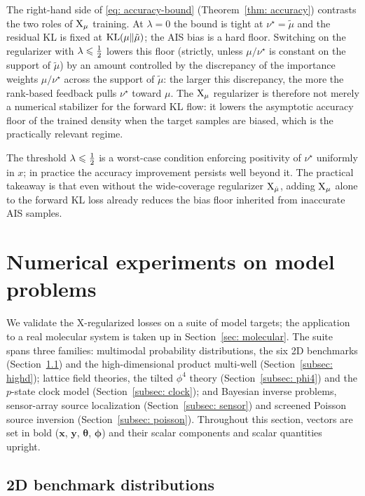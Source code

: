 \documentclass{article}
\begin{document}
The right-hand side of \eqref{eq: accuracy-bound} (Theorem~\ref{thm: accuracy}) contrasts the two roles of $\mathrm{X}_\mu$ training. At $\lambda = 0$ the bound is tight at $\nu^\star = \tilde\mu$ and the residual KL is fixed at $\mathrm{KL}(\mu\|\tilde\mu)$; the AIS bias is a hard floor. Switching on the regularizer with $\lambda \leqslant \frac12$ lowers this floor (strictly, unless $\mu/\nu^\star$ is constant on the support of $\tilde\mu$) by an amount controlled by the discrepancy of the importance weights $\mu/\nu^\star$ across the support of $\tilde\mu$: the larger this discrepancy, the more the rank-based feedback pulls $\nu^\star$ toward $\mu$. The $\mathrm{X}_\mu$ regularizer is therefore not merely a numerical stabilizer for the forward KL flow: it lowers the asymptotic accuracy floor of the trained density when the target samples are biased, which is the practically relevant regime.

The threshold $\lambda \leqslant \frac12$ is a worst-case condition enforcing positivity of $\nu^\star$ uniformly in $x$; in practice the accuracy improvement persists well beyond it. The practical takeaway is that even without the wide-coverage regularizer $\mathrm{X}_{\hat\mu}$, adding $\mathrm{X}_\mu$ alone to the forward KL loss already reduces the bias floor inherited from inaccurate AIS samples.


\section{Numerical experiments on model problems}
\label{sec: experiments}

We validate the X-regularized losses on a suite of model targets; the application to a real molecular system is taken up in Section~\ref{sec: molecular}. The suite spans three families: multimodal probability distributions, the six 2D benchmarks (Section~\ref{subsec: 2d-benchmark}) and the high-dimensional product multi-well (Section~\ref{subsec: highd}); lattice field theories, the tilted $\phi^4$ theory (Section~\ref{subsec: phi4}) and the $p$-state clock model (Section~\ref{subsec: clock}); and Bayesian inverse problems, sensor-array source localization (Section~\ref{subsec: sensor}) and screened Poisson source inversion (Section~\ref{subsec: poisson}). Throughout this section, vectors are set in bold ($\mathbf{x}$, $\mathbf{y}$, $\boldsymbol{\theta}$, $\boldsymbol{\phi}$) and their scalar components and scalar quantities upright.

\subsection{2D benchmark distributions}
\label{subsec: 2d-benchmark}
\end{document}
